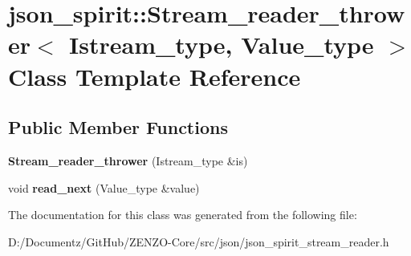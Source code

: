 \hypertarget{classjson__spirit_1_1_stream__reader__thrower}{}\section{json\+\_\+spirit\+::Stream\+\_\+reader\+\_\+thrower$<$ Istream\+\_\+type, Value\+\_\+type $>$ Class Template Reference}
\label{classjson__spirit_1_1_stream__reader__thrower}
\subsection*{Public Member Functions}
\begin{DoxyCompactItemize}
\item 
\mbox{\label{classjson__spirit_1_1_stream__reader__thrower_a702cfd4fc32e9ec5dd7009e8393b5f9b}} 
{\bfseries Stream\+\_\+reader\+\_\+thrower} (Istream\+\_\+type \&is)
\item 
\mbox{\label{classjson__spirit_1_1_stream__reader__thrower_a81a7d8e8705c328a9947d5ddccecc5f7}} 
void {\bfseries read\+\_\+next} (Value\+\_\+type \&value)
\end{DoxyCompactItemize}


The documentation for this class was generated from the following file\+:\begin{DoxyCompactItemize}
\item 
D\+:/\+Documentz/\+Git\+Hub/\+Z\+E\+N\+Z\+O-\/\+Core/src/json/json\+\_\+spirit\+\_\+stream\+\_\+reader.\+h\end{DoxyCompactItemize}
